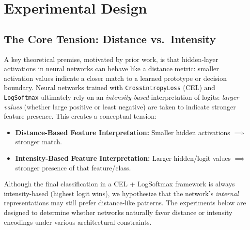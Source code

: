 \section{Experimental Design}
\label{sec:exp_design}

\subsection{The Core Tension: Distance vs.\ Intensity}
\label{sec:core_tension}
A key theoretical premise, motivated by prior work, is that hidden-layer activations in neural networks can behave like a distance metric: smaller activation values indicate a closer match to a learned prototype or decision boundary. Neural networks trained with \texttt{CrossEntropyLoss} (CEL) and \texttt{LogSoftmax} ultimately rely on an \emph{intensity-based} interpretation of logits: \emph{larger values} (whether large positive or least negative) are taken to indicate stronger feature presence.  This creates a conceptual tension:
\begin{itemize}
    \item \textbf{Distance-Based Feature Interpretation:} Smaller hidden activations $\implies$ stronger match.
    \item \textbf{Intensity-Based Feature Interpretation:} Larger hidden/logit values $\implies$ stronger presence of that feature/class.
\end{itemize}

Although the final classification in a CEL + LogSoftmax framework is always intensity-based (highest logit wins), we hypothesize that the network's \emph{internal} representations may still prefer distance-like patterns. The experiments below are designed to determine whether networks naturally favor distance or intensity encodings under various architectural constraints.

